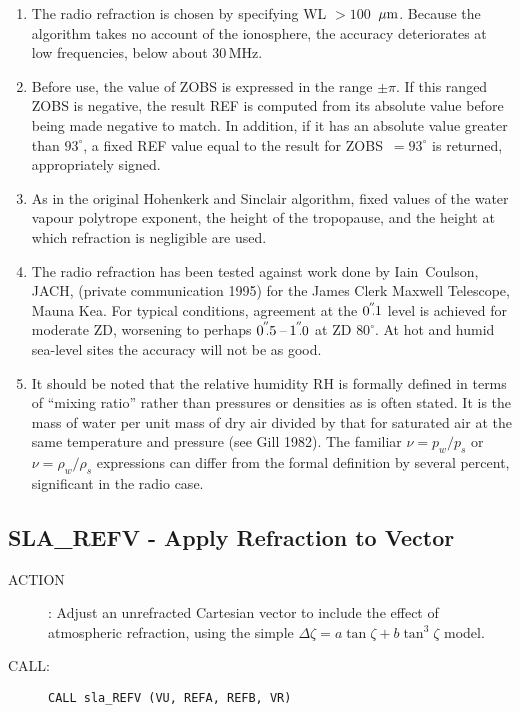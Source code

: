 \documentclass[11pt,twoside]{article}
\newcommand{\xlabel}[1]{}
\newcommand{\arcsec}[2] {\arcseci{#1}$\hspace{-0.4em}.#2$}
\newcommand{\arcsec}[2] {
      {$#1\hspace{-0.05em}^{'\hspace{-0.1em}'}\hspace{-0.4em}.#2$}
   }
\newcommand{\arcseci}[1] {$#1\hspace{-0.05em}$\raisebox{-0.5ex}
                         {$^{'\hspace{-0.1em}'}$}}
\renewcommand{\arcseci}[1] {$#1\hspace{-0.05em}^{'\hspace{-0.1em}'}$}
\newcommand{\routine}[3]
{\hbadness=10000
  \vbox
  {
    \rule{\textwidth}{0.3mm}\\
    {\Large {\bf #1} \hfill #2 \hfill {\bf #1}}\\
    \setlength{\oldspacing}{\topsep}
    \setlength{\topsep}{0.3ex}
    \begin{description}
      #3
    \end{description}
    \setlength{\topsep}{\oldspacing}
  }
}
\renewcommand{\routine}[3]
   {
      \subsection{#1\xlabel{#1} - #2\label{#1}}
       \begin{description}
         #3
       \end{description}
   }
\newcommand{\action}[1]
{\item[ACTION]: #1}
\newcommand{\action}[1]
   {\item[ACTION:] #1}
\newcommand{\call}[1]
{\item[CALL]: \hspace{0.4em}{\tt #1}}
\newlength{\oldspacing}
\renewcommand{\call}[1]
   {
    \item[CALL:] {\tt #1}
   }
\begin{document}
{\begin{enumerate}
        for any reasonable combination of parameters.  However, the
        improved water-vapour expressions do make a significant difference
        in the radio band, at $70^\circ$ zenith distance reaching almost
        \arcseci{4} for a hot, humid, low-altitude site during a period of
        low pressure.
  \item The radio refraction is chosen by specifying WL $>100$~$\mu{\rm m}$.
        Because the algorithm takes no account of the ionosphere, the
        accuracy deteriorates at low frequencies, below about 30\,MHz.
  \item Before use, the value of ZOBS is expressed in the range $\pm\pi$.
        If this ranged ZOBS is negative, the result REF is computed from its
        absolute value before being made negative to match.  In addition, if
        it has an absolute value greater than $93^\circ$, a fixed REF value
        equal to the result for ZOBS~$=93^\circ$ is returned, appropriately
        signed.
  \item As in the original Hohenkerk and Sinclair algorithm, fixed values
        of the water vapour polytrope exponent, the height of the
        tropopause, and the height at which refraction is negligible are
        used.
  \item The radio refraction has been tested against work done by
        Iain~Coulson, JACH, (private communication 1995) for the
        James Clerk Maxwell Telescope, Mauna Kea.  For typical conditions,
        agreement at the \arcsec{0}{1} level is achieved for moderate ZD,
        worsening to perhaps \arcsec{0}{5}\,--\,\arcsec{1}{0} at ZD $80^\circ$.
        At hot and humid sea-level sites the accuracy will not be as good.
  \item It should be noted that the relative humidity RH is formally
        defined in terms of ``mixing ratio'' rather than pressures or
        densities as is often stated.  It is the mass of water per unit
        mass of dry air divided by that for saturated air at the same
        temperature and pressure (see Gill 1982).  The familiar
        $\nu=p_w/p_s$ or $\nu=\rho_w/\rho_s$ expressions can differ from
        the formal definition by several percent, significant in the
        radio case.
  \end{enumerate}
}
\routine{SLA\_REFV}{Apply Refraction to Vector}
{
 \action{Adjust an unrefracted Cartesian vector to include the effect of
         atmospheric refraction, using the simple
         $\Delta \zeta = a \tan \zeta + b \tan^{3} \zeta$ model.}
 \call{CALL sla\_REFV (VU, REFA, REFB, VR)}
}
\end{document}
